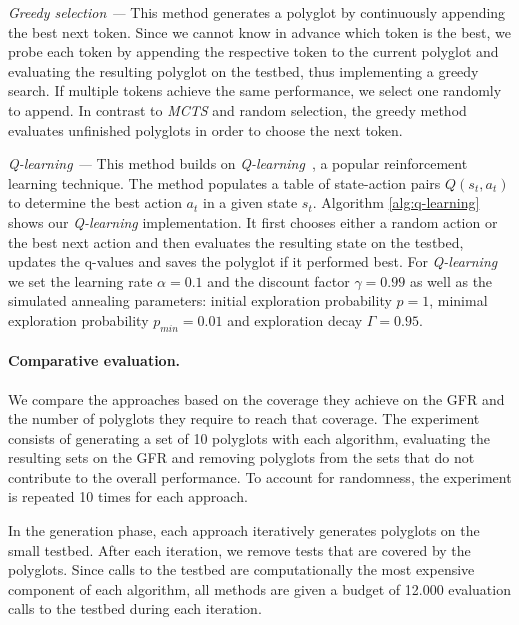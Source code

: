 \smallskip
\emph{Greedy selection ---} This method generates a polyglot by continuously appending the best next token.
Since we cannot know in advance which token is the best, we probe each token by appending the respective token to the current polyglot and evaluating the resulting polyglot on the testbed, thus implementing a greedy search.
If multiple tokens achieve the same performance, we select one randomly to append.
In contrast to \emph{MCTS} and random selection, the greedy method evaluates unfinished polyglots in order to choose the next token.

\smallskip
\emph{Q-learning ---} This method builds on \emph{Q-learning}~\cite{watkins1992q}, a popular reinforcement learning technique.
The method populates a table of state-action pairs $Q(s_t, a_t)$ to determine the best action $a_t$ in a given state $s_t$. 
Algorithm \ref{alg:q-learning} shows our \emph{Q-learning} implementation. 
It first chooses either a random action or the best next action and then evaluates the resulting state on the testbed, updates the q-values and saves the polyglot if it performed best.
For \emph{Q-learning} we set the learning rate $\alpha=0.1$ and the discount factor $\gamma=0.99$ as well as the simulated annealing parameters: initial exploration probability $p=1$, minimal exploration probability $p_{min}=0.01$ and exploration decay $\Gamma=0.95$.



\vspace{-1em}\paragraph{Comparative evaluation.}
We compare the approaches based on the coverage they achieve on the GFR and the number of polyglots they require to reach that coverage. The experiment consists of generating a set of \num{10} polyglots with each algorithm, evaluating the resulting sets on the GFR and removing polyglots from the sets that do not contribute to the overall performance. To account for randomness, the experiment is repeated \num{10} times for each approach.

In the generation phase, each approach iteratively generates polyglots on the small testbed. 
After each iteration, we remove tests that are covered by the polyglots. 
Since calls to the testbed are computationally the most expensive component of each algorithm, all methods are given a budget of \num{12,000} evaluation calls to the testbed during each iteration.

